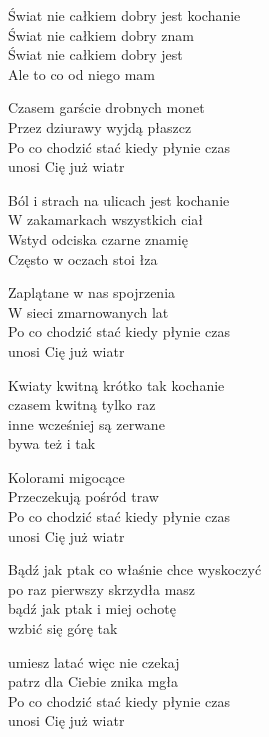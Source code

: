 \begin{text}
Świat nie całkiem dobry jest kochanie\\
Świat nie całkiem dobry znam\\
Świat nie całkiem dobry jest\\
Ale to co od niego mam

Czasem garście drobnych monet\\
Przez dziurawy wyjdą płaszcz\\
Po co chodzić stać kiedy płynie czas\\
unosi Cię już wiatr

Ból i strach na ulicach jest kochanie\\
W zakamarkach wszystkich ciał\\
Wstyd odciska czarne znamię\\
Często w oczach stoi łza

Zaplątane w nas spojrzenia\\
W sieci zmarnowanych lat\\
Po co chodzić stać kiedy płynie czas\\
unosi Cię już wiatr

Kwiaty kwitną krótko tak kochanie\\
czasem kwitną tylko raz\\
inne wcześniej są zerwane\\
bywa też i tak

Kolorami migocące\\
Przeczekują pośród traw\\
Po co chodzić stać kiedy płynie czas\\
unosi Cię już wiatr

Bądź jak ptak co właśnie chce wyskoczyć\\
po raz pierwszy skrzydła masz \\
bądź jak ptak i miej ochotę\\
wzbić się górę tak

umiesz latać więc nie czekaj\\
patrz dla Ciebie znika mgła\\
Po co chodzić stać kiedy płynie czas\\
unosi Cię już wiatr
\end{text}
